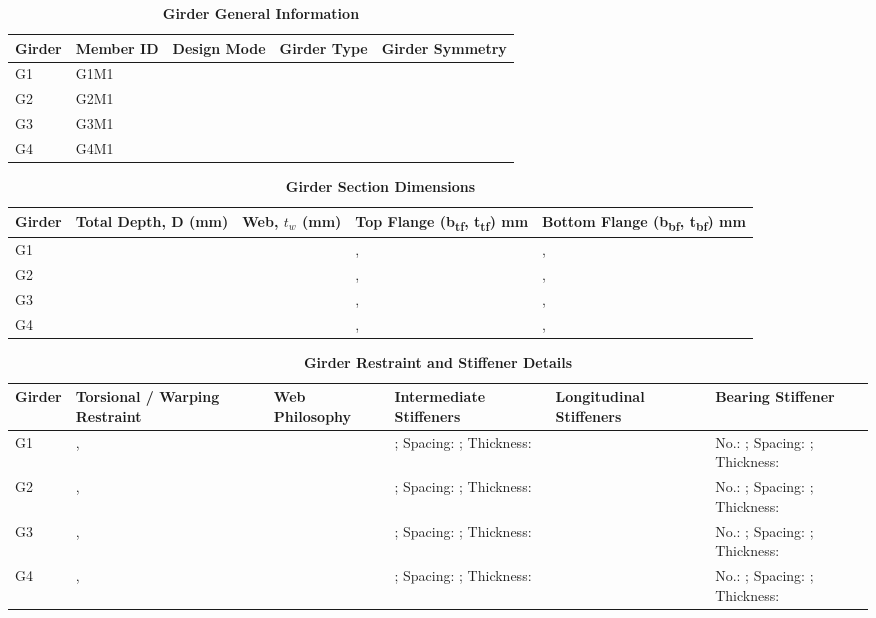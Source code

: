 \documentclass[12pt,a4paper]{report}
\numberwithin{table}{chapter}
\numberwithin{figure}{chapter}
\begin{document}
\vspace{0.4em}
\noindent
            
\vspace{4pt}
\begin{longtable}{|L{2.2cm}|L{1.8cm}|p{3.8cm}|p{3.8cm}|p{3.8cm}|}
\caption{\textbf{Girder General Information}}
\hline
\textbf{Girder} & \textbf{Member ID} & \textbf{Design Mode} & \textbf{Girder Type} & \textbf{Girder Symmetry} \\[6pt]
\hline
G1 & G1M1 &  &  &  \\[8pt]
\hline
G2 & G2M1 &  &  &  \\[8pt]
\hline
G3 & G3M1 &  &  &  \\[8pt]
\hline
G4 & G4M1 &  &  &  \\[8pt]
\hline
\end{longtable}

\vspace{0.6em}

\vspace{4pt}
\begin{longtable}{|L{1.8cm}|L{2.3cm}|L{1.8cm}|p{4.8cm}|p{4.8cm}|}
\caption{\textbf{Girder Section Dimensions}}
\hline
\textbf{Girder} & \textbf{Total Depth, D (mm)} & \textbf{Web, $t_w$ (mm)} & \textbf{Top Flange (b\textsubscript{tf}, t\textsubscript{tf}) mm} & \textbf{Bottom Flange (b\textsubscript{bf}, t\textsubscript{bf}) mm} \\[6pt]
\hline
G1 &  &  & ,  & ,  \\[8pt]
\hline
G2 &  &  & ,  & ,  \\[8pt]
\hline
G3 &  &  & ,  & ,  \\[8pt]
\hline
G4 &  &  & ,  & ,  \\[8pt]
\hline
\end{longtable}

\vspace{0.6em}

\vspace{4pt}
\begin{longtable}{|L{1.4cm}|p{2.2cm}|p{2.2cm}|p{3.0cm}|p{2.4cm}|p{2.2cm}|}
\caption{\textbf{Girder Restraint and Stiffener Details}}\\
\hline
\textbf{Girder} & \textbf{Torsional / Warping Restraint} & \textbf{Web Philosophy} & \textbf{Intermediate Stiffeners} & \textbf{Longitudinal Stiffeners} & \textbf{Bearing Stiffener} \\[6pt]
\hline
\endfirsthead
\endhead

G1 & ,  &  & ; Spacing: ; Thickness:  &  & No.: ; Spacing: ; Thickness:  \\[8pt]
\hline
G2 & ,  &  & ; Spacing: ; Thickness:  &  & No.: ; Spacing: ; Thickness:  \\[8pt]
\hline
G3 & ,  &  & ; Spacing: ; Thickness:  &  & No.: ; Spacing: ; Thickness:  \\[8pt]
\hline
G4 & ,  &  & ; Spacing: ; Thickness:  &  & No.: ; Spacing: ; Thickness:  \\[8pt]
\hline
\end{longtable}
\end{document}
